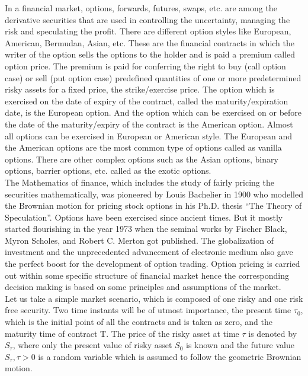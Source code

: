 \documentclass[12pt, a4paper]{report}
\begin{document}
In a financial market, options, forwards, futures, swaps, etc. are among the derivative securities that are used in controlling the uncertainty, managing the risk and speculating the profit. There are different option styles like European, American, Bermudan, Asian, etc. These are the financial contracts in which the writer of the option sells the options to the holder and is paid a premium called option price. The premium is paid for conferring the right to buy (call option case) or sell (put option case) predefined quantities of one or more predetermined risky assets for a fixed price, the strike/exercise price. The option which is exercised on the date of expiry of the contract, called the maturity/expiration date, is the European option. And the option which can be exercised on or before the date of the maturity/expiry of the contract is the American option. Almost all options can be exercised in European or American style. The European and the American options are the most common type of options called as vanilla options. There are other complex options such as the Asian options, binary options, barrier options, etc. called as the exotic options.\\

The Mathematics of finance, which includes the study of fairly pricing the securities mathematically, was pioneered by Louis Bachelier in 1900 who modelled the Brownian motion for pricing stock options in his Ph.D. thesis “The Theory of Speculation”. Options have been exercised since ancient times. But it mostly started flourishing in the year 1973 when the seminal works by Fischer Black, Myron Scholes, and Robert C. Merton got published. The globalization of investment and the unprecedented advancement of electronic medium also gave the perfect boost for the development of option trading. Option pricing is carried out within some specific structure of financial market hence the corresponding decision making is based on some principles and assumptions of the market.\\

Let us take a simple market scenario, which is composed of one risky and one risk free security. Two time instants will be of utmost importance, the present time $\tau_{0}$, which is the initial point of all the contracts and is taken as zero, and the maturity time of contract T. The price of the risky asset at time $\tau$ is denoted by $S_{\tau}$, where only the present value of risky asset $S_{0}$ is known and the future value $S_{\tau}, \tau>0$ is a random variable which is assumed to follow the geometric Brownian motion.\\
\end{document}
